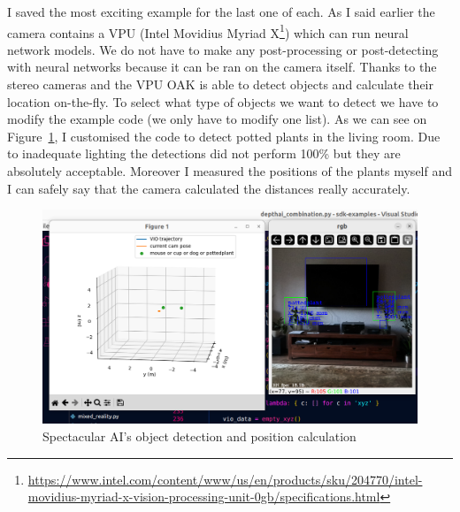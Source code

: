 I saved the most exciting example for the last one of each. As I said earlier the camera contains a VPU (Intel Movidius Myriad X\footnote{\url{https://www.intel.com/content/www/us/en/products/sku/204770/intel-movidius-myriad-x-vision-processing-unit-0gb/specifications.html}}) which can run neural network models. We do not have to make any post-processing or post-detecting with neural networks because it can be ran on the camera itself. Thanks to the stereo cameras and the VPU OAK is able to detect objects and calculate their location on-the-fly. To select what type of objects we want to detect we have to modify the example code (we only have to modify one list). As we can see on Figure~\ref{fig:SPAI_depthai}, I customised the code to detect potted plants in the living room. Due to inadequate lighting the detections did not perform 100\% but they are absolutely acceptable. Moreover I measured the positions of the plants myself and I can safely say that the camera calculated the distances really accurately.

\begin{figure}[H]
	\centering
	\includegraphics[width=150mm, keepaspectratio]{figures/spectacular_ai_depthai_combination.png}
	\caption{Spectacular AI's object detection and position calculation}
	\label{fig:SPAI_depthai}
\end{figure}
